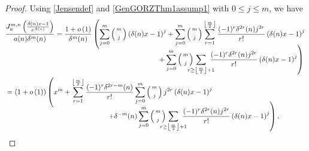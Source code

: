 \documentclass[11pt,reqno,a4paper]{amsart}
\renewcommand{\d}{{\delta}}
\renewcommand{\(}{\left\(}
\renewcommand{\)}{\right\)}
\numberwithin{equation}{section}
\theoremstyle{plain}
\theoremstyle{definition} %
\numberwithin{equation}{section}
\renewcommand{\binom}[2]{\left(\begin{smallmatrix}#1\\\\#2\end{smallmatrix}\right)}
\begin{document}
\begin{proof}
	Using \eqref{Jensendef} and \ref{GenGORZThm1assump1} with $0\le j\le m$, we have  
	\begin{align}\label{Jenseneqn1} 
	&\frac{J^{m,n}_{a}\left(\frac{\d(n)x-1}{e^{A(n)}}\right)}{a(n)\d^{m}(n)}
	=\frac{1+o\left(1\right)}{\d^{m}(n)}\left(\sum_{j=0}^{m}\binom{m}{j}\left(\d(n)x-1\right)^j+\sum_{j=0}^{m}\binom{m}{j}\sum_{r=1}^{\left\lfloor\frac m2\right\rfloor}\frac{(-1)^r\d^{2r}(n)j^{2r}}{r!}\left(\d(n)x-1\right)^j\right.\nonumber\\[-1em]
	&\hspace{7.5 cm}\left.+\sum_{j=0}^{m}\binom{m}{j}\!\!\!\!\!\!\sum_{r\ge \left\lfloor\frac m2\right\rfloor+1}\!\!\!\!\!\frac{(-1)^r\d^{2r}(n)j^{2r}}{r!}\left(\d(n)x-1\right)^j\right)\nonumber\\
	&=\left(1+o\left(1\right)\right)\left(x^{m}+\sum_{r=1}^{\left\lfloor\frac m2\right\rfloor}\frac{(-1)^r\d^{2r-m}(n)}{r!}\sum_{j=0}^{m}\binom{m}{j}j^{2r}\left(\d(n)x-1\right)^j\right.\nonumber\\[-1.2em]
	&\hspace{5 cm}\left.+\d^{-m}(n)\sum_{j=0}^{m}\binom{m}{j}\!\!\!\!\!\!\sum_{r\ge \left\lfloor\frac m2\right\rfloor+1}\!\!\!\!\!\frac{(-1)^r\d^{2r}(n)j^{2r}}{r!}\left(\d(n)x-1\right)^j\right).%
	\end{align}
	

\end{proof}
\end{document}
